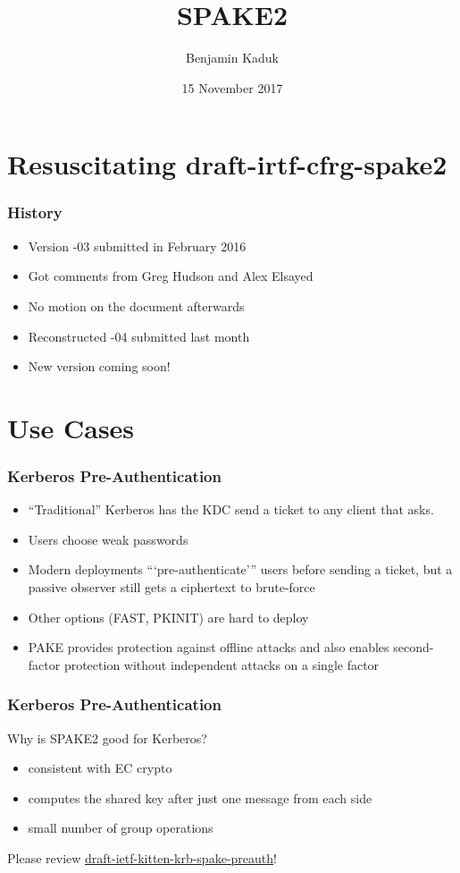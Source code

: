 \documentclass{beamer}
\title{SPAKE2}
\author{Benjamin Kaduk}
\date{15 November 2017}
\begin{document}
\begin{frame}
\titlepage
\end{frame}

\section{Resuscitating draft-irtf-cfrg-spake2}

\begin{frame}
\frametitle{History}
\begin{itemize}
\item{Version -03 submitted in February 2016}
\item{Got comments from Greg Hudson and Alex Elsayed}
\item{No motion on the document afterwards}
\item{Reconstructed -04 submitted last month}
\item{New version coming soon!}
\end{itemize}
\end{frame}

\section{Use Cases}

\begin{frame}
\frametitle{Kerberos Pre-Authentication}
\begin{itemize}
\item{``Traditional'' Kerberos has the KDC send a ticket to any client that asks.}
\item{Users choose weak passwords}
\item{Modern deployments ```pre-authenticate''' users before sending a ticket,
but a passive observer still gets a ciphertext to brute-force}
\item{Other options (FAST, PKINIT) are hard to deploy}
\item{PAKE provides protection against offline attacks and also enables
second-factor protection without independent attacks on a single factor}
\end{itemize}
\end{frame}

\begin{frame}[fragile]
\frametitle{Kerberos Pre-Authentication}
Why is SPAKE2 good for Kerberos?
\begin{itemize}
\item{consistent with EC crypto}
\item{computes the shared key after just one message from each side}
\item{small number of group operations}
\end{itemize}

Please review \url{draft-ietf-kitten-krb-spake-preauth}!
\end{frame}
\end{document}
